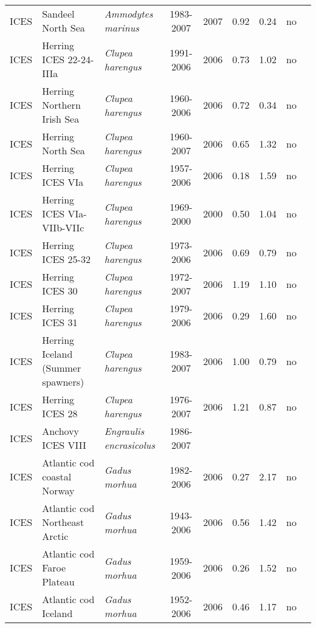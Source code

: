 \begin{longtable}{p{1.8cm}p{4cm}p{4cm}ccccp{1.9cm}c}
  ICES & Sandeel North Sea & \textit{Ammodytes marinus} & 1983-2007 & 2007 & 0.92 & 0.24 & no & \cite{ICES-WGNSSK-2007.pdf} \\ 
  ICES & Herring ICES 22-24-IIIa & \textit{Clupea harengus} & 1991-2006 & 2006 & 0.73 & 1.02 & no & \cite{ICES-HAWG-2007.pdf} \\ 
  ICES & Herring Northern Irish Sea & \textit{Clupea harengus} & 1960-2006 & 2006 & 0.72 & 0.34 & no & \cite{ICES-HAWG-2007.pdf} \\ 
  ICES & Herring North Sea & \textit{Clupea harengus} & 1960-2007 & 2006 & 0.65 & 1.32 & no & \cite{ICES-HAWG-2007.pdf} \\ 
  ICES & Herring ICES VIa & \textit{Clupea harengus} & 1957-2006 & 2006 & 0.18 & 1.59 & no & \cite{ICES-HAWG-2007.pdf} \\ 
  ICES & Herring ICES VIa-VIIb-VIIc & \textit{Clupea harengus} & 1969-2000 & 2000 & 0.50 & 1.04 & no & \cite{ICES-HAWG-2007.pdf} \\ 
  ICES & Herring ICES 25-32 & \textit{Clupea harengus} & 1973-2006 & 2006 & 0.69 & 0.79 & no & \cite{ICES-WGBFAS-2007.pdf} \\ 
  ICES & Herring ICES 30 & \textit{Clupea harengus} & 1972-2007 & 2006 & 1.19 & 1.10 & no & \cite{ICES-WGBFAS-2007.pdf} \\ 
  ICES & Herring ICES 31 & \textit{Clupea harengus} & 1979-2006 & 2006 & 0.29 & 1.60 & no & \cite{ICES-WGBFAS-2007.pdf} \\ 
  ICES & Herring Iceland (Summer spawners) & \textit{Clupea harengus} & 1983-2007 & 2006 & 1.00 & 0.79 & no & \cite{ICES-NWWG-2007.pdf} \\ 
  ICES & Herring ICES 28 & \textit{Clupea harengus} & 1976-2007 & 2006 & 1.21 & 0.87 & no & \cite{ICES-WGBFAS-2007.pdf} \\ 
  ICES & Anchovy ICES VIII & \textit{Engraulis encrasicolus} & 1986-2007 &  &  &  &  & \cite{ICES-WGMHSA007.pdf} \\ 
  ICES & Atlantic cod coastal Norway & \textit{Gadus morhua} & 1982-2006 & 2006 & 0.27 & 2.17 & no & \cite{ICES-AFWG-2007.pdf} \\ 
  ICES & Atlantic cod Northeast Arctic & \textit{Gadus morhua} & 1943-2006 & 2006 & 0.56 & 1.42 & no & \cite{AFWG-NEAR-Gadusmorhua-2007.pdf} \\ 
  ICES & Atlantic cod Faroe Plateau & \textit{Gadus morhua} & 1959-2006 & 2006 & 0.26 & 1.52 & no & \cite{ICES-NWWG-2007.pdf} \\ 
  ICES & Atlantic cod Iceland & \textit{Gadus morhua} & 1952-2006 & 2006 & 0.46 & 1.17 & no & \cite{ICES-NWWG-2007.pdf} \\ 

\end{longtable}
